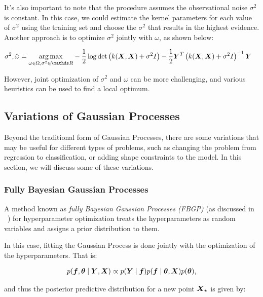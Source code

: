 It's also important to note that the procedure assumes the observational noise \( \sigma^2 \) is constant. In this case, we could estimate the kernel parameters for each value of \( \sigma^2 \) using the training set and choose the \( \sigma^2 \) that results in the highest evidence. Another approach is to optimize \( \sigma^2 \) jointly with \( \omega \), as shown below:

\begin{align}
\sigma^{2}, \hat{\omega} &= \underset{\omega \in \Omega, \sigma^2 \in \bR}{\arg \max} -\frac{1}{2} \log \det \left( k(\bfX, \bfX) + \sigma^2 I \right) - \frac{1}{2} \bfY^T \left( k(\bfX, \bfX) + \sigma^2 I \right)^{-1} \bfY \label{eq:kernel_optimization_joint}
\end{align}

However, joint optimization of \( \sigma^2 \) and \( \omega \) can be more challenging, and various heuristics can be used to find a local optimum.

\subsection{Variations of Gaussian Processes}

Beyond the traditional form of Gaussian Processes, there are some variations that may be useful for different types of problems, such as changing the problem from regression to classification, or adding shape constraints to the model. In this section, we will discuss some of these variations.

\subsubsection{Fully Bayesian Gaussian Processes}

A method known as \textit{fully Bayesian Gaussian Processes (FBGP)} (as discussed in ~\cite{Riis2022}) for hyperparameter optimization treats the hyperparameters as random variables and assigns a prior distribution to them.

In this case, fitting the Gaussian Process is done jointly with the optimization of the hyperparameters. That is:

\begin{align}
    p(\boldsymbol{f}, \boldsymbol{\theta} \mid \boldsymbol{Y}, \boldsymbol{X}) &\propto p(\boldsymbol{Y} \mid \boldsymbol{f}) p(\boldsymbol{f} \mid \boldsymbol{\theta}, \boldsymbol{X}) p(\boldsymbol{\theta}), \nonumber \\
\end{align}

and thus the posterior predictive distribution for a new point \( \boldsymbol{X}_\star \) is given by:

